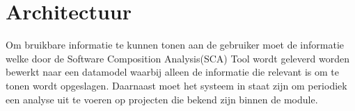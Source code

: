 \chapter{Architectuur}\label{ch:Architectuur}
Om bruikbare informatie te kunnen tonen aan de gebruiker moet de informatie welke door de Software Composition Analysis(SCA) Tool wordt geleverd worden bewerkt naar een datamodel waarbij alleen de informatie die relevant is om te tonen wordt opgeslagen. Daarnaast moet het systeem in staat zijn om periodiek een analyse uit te voeren op projecten die bekend zijn binnen de module.